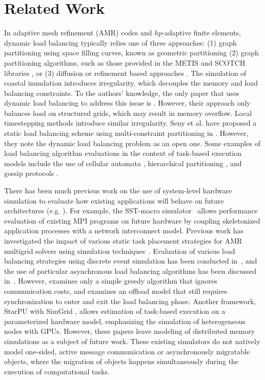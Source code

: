 \section{Related Work}
\label{sec:related}

In adaptive mesh refinement (AMR) codes and $hp$-adaptive finite elements, dynamic load balancing typically relies one of three approaches: (1) graph partitioning using space filling curves, known as geometric partitioning \cite{Devine2005,Burstedde2011,Blaise2012,Ferreira2017} (2) graph partitioning algorithms, such as those provided in the METIS and SCOTCH libraries \cite{Bhatele2012,scotch,Karypis1998,Devine2005,Aykanat2007}, or (3) diffusion or refinement based approaches \cite{Schloegel1997}.
The simulation of coastal inundation introduces irregularity, which decouples the memory and load balancing constraints.
To the authors' knowledge, the only paper that uses dynamic load balancing to address this issue is \cite{Asuncion2016}. However, their approach only balances load on structured grids, which may result in memory overflow.
Local timestepping methods introduce similar irregularity.
Seny et al. have proposed a static load balancing scheme using multi-constraint partitioning in \cite{Seny2014}.
However, they note the dynamic load balancing problem as an open one.
Some examples of load balancing algorithm evaluations in the context of task-based execution models include the use of cellular automata \cite{Hosoori2011}, hierarchical partitioning \cite{Zheng2010}, and gossip protocols \cite{Menon2013}.

There has been much previous work on the use of system-level hardware simulation to evaluate how existing applications will behave on future architectures (e.g. \cite{Janssen2011,Mubarak2014,Zhang2016,Jain2016,Barrett2012}).
For example, the SST-macro simulator~\cite{janssen2010} allows performance evaluation of existing MPI programs on future hardware by coupling skeletonized application processes with a network interconnect model.
Previous work has investigated the impact of various static task placement strategies for AMR multigrid solvers using simulation techniques~\cite{Chan2016}.
Evaluation of various load balancing strategies using discrete event simulation has been conducted in~\cite{Zheng2005}, and the use of particular asynchronous load balancing algorithms has been discussed in~\cite{Zheng2006,Pearce2016}.
However, \cite{Zheng2006} examines only a simple greedy algorithm that ignores communication costs, and \cite{Pearce2016} examines an offload model that still requires synchronization to enter and exit the load balancing phase.
Another framework, StarPU with SimGrid \cite{Stanisic2015,Stanisic2015b}, allows estimation of task-based execution on a parameterized hardware model, emphasizing the simulation of heterogeneous nodes with GPUs. However, these papers leave modeling of distributed memory simulations as a subject of future work.
These existing simulators do not natively model one-sided, active message communication or asynchronously migratable objects, where the migration of objects happens simultaneously during the execution of computational tasks.

